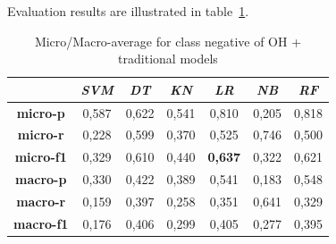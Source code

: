 Evaluation results are illustrated in table~\ref{tab:ohneg}.


\begin{table}[h]
\centering
\begin{tabular}{|c|c|c|c|c|c|c|}
\hline
\multicolumn{1}{|l|}{} &
  \multicolumn{1}{c|}{\textit{\textbf{SVM}}} &
  \multicolumn{1}{c|}{\textit{\textbf{DT}}} &
  \multicolumn{1}{c|}{\textit{\textbf{KN}}} &
  \multicolumn{1}{c|}{\textit{\textbf{LR}}} &
  \multicolumn{1}{c|}{\textit{\textbf{NB}}} &
  \multicolumn{1}{c|}{\textit{\textbf{RF}}} \\ \hline
\textbf{micro-p}  & 0,587 &0,622 &0,541 &0,810 &0,205 &0,818 \\ \hline
\textbf{micro-r}  & 0,228 &0,599 &0,370 &0,525 &0,746 &0,500 \\ \hline
\textbf{micro-f1} & 0,329 &0,610 &0,440 &\textbf{0,637} &0,322 &0,621 \\ \hline
\textbf{macro-p}  & 0,330 &0,422 &0,389 &0,541 &0,183 &0,548 \\ \hline
\textbf{macro-r}  & 0,159 &0,397 &0,258 &0,351 &0,641 &0,329 \\ \hline
\textbf{macro-f1} & 0,176 &0,406 &0,299 &0,405 &0,277 &0,395 \\ \hline
\end{tabular}
\caption{Micro/Macro-average for class negative of OH + traditional models}
\label{tab:ohneg}
\end{table}


